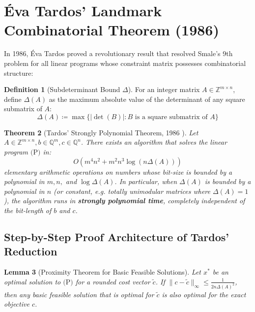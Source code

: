 \documentclass[11pt,a4paper]{article}
\newtheorem{theorem}{Theorem}[section]
\newtheorem{lemma}[theorem]{Lemma}
\theoremstyle{definition}
\newtheorem{definition}[theorem]{Definition}
\begin{document}
\section{Éva Tardos' Landmark Combinatorial Theorem (1986)}

In 1986, Éva Tardos \cite{tardos1986} proved a revolutionary result that resolved Smale's 9th problem for all linear programs whose constraint matrix possesses combinatorial structure:

\begin{definition}[Subdeterminant Bound $\Delta$]\label{def:subdeterminant}
For an integer matrix $A \in \mathbb{Z}^{m \times n}$, define $\Delta(A)$ as the maximum absolute value of the determinant of any square submatrix of $A$:
\begin{equation}\label{eq:delta_def}
\Delta(A) \coloneqq \max \{ |\det(B)| : B \text{ is a square submatrix of } A \}
\end{equation}
\end{definition}

\begin{theorem}[Tardos' Strongly Polynomial Theorem, 1986 \cite{tardos1986}]\label{thm:tardos}
Let $A \in \mathbb{Z}^{m \times n}, b \in \mathbb{Q}^m, c \in \mathbb{Q}^n$. There exists an algorithm that solves the linear program $\text{(P)}$ in:
\begin{equation}\label{eq:tardos_complexity}
O(m^4 n^2 + m^2 n^3 \log(n \Delta(A)))
\end{equation}
elementary arithmetic operations on numbers whose bit-size is bounded by a polynomial in $m, n,$ and $\log \Delta(A)$.
In particular, when $\Delta(A)$ is bounded by a polynomial in $n$ (or constant, e.g. totally unimodular matrices where $\Delta(A) = 1$), the algorithm runs in \textbf{strongly polynomial time}, completely independent of the bit-length of $b$ and $c$.
\end{theorem}

\subsection{Step-by-Step Proof Architecture of Tardos' Reduction}

\begin{lemma}[Proximity Theorem for Basic Feasible Solutions]\label{lem:proximity}
Let $x^*$ be an optimal solution to $\text{(P)}$ for a rounded cost vector $\tilde{c}$. If $\|c - \tilde{c}\|_\infty \le \frac{1}{2 n \Delta(A)^2}$, then any basic feasible solution that is optimal for $\tilde{c}$ is also optimal for the exact objective $c$.
\end{lemma}
\end{document}
